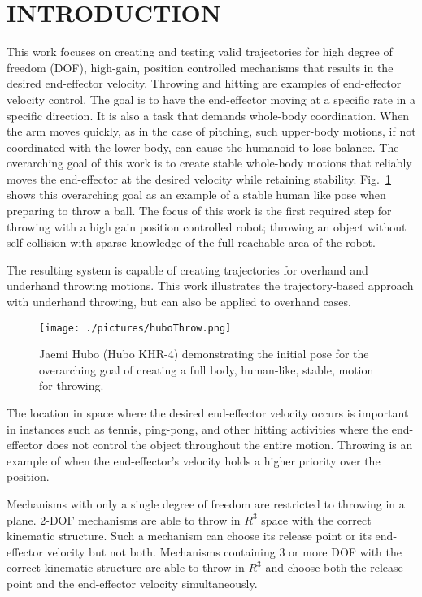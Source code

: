 \section{INTRODUCTION}\label{sec:intro}

This work focuses on creating and testing valid trajectories for high degree of freedom (DOF), high-gain, position controlled mechanisms that results in the desired end-effector velocity.  Throwing and hitting are examples of end-effector velocity control.  The goal is to have the end-effector moving at a specific rate in a specific direction.  It is also a task that demands whole-body coordination.  When the arm moves quickly, as in the case of pitching, such upper-body motions, if not coordinated with the lower-body, can cause the humanoid to lose balance.  The overarching goal of this work is to create stable whole-body motions that reliably moves the end-effector at the desired velocity while retaining stability.  Fig.~\ref{fig:huboOneFoot} shows this overarching goal as an example of a stable human like pose when preparing to throw a ball.  The focus of this work is the first required step for throwing with a high gain position controlled robot; throwing an object without self-collision with sparse knowledge of the full reachable area of the robot.  

The resulting system is capable of creating trajectories for overhand and underhand throwing motions.  This work illustrates the trajectory-based approach with underhand throwing, but can also be applied to overhand cases.

\begin{figure}[t!]%
  \centering
\texttt{[image: ./pictures/huboThrow.png]}
  \caption{Jaemi Hubo (Hubo KHR-4) demonstrating the initial pose for the overarching goal of creating a full body, human-like, stable, motion for throwing.}
  \label{fig:huboOneFoot}
\end{figure}

The location in space where the desired end-effector velocity occurs is important in instances such as tennis, ping-pong, and other hitting activities where the end-effector does not control the object throughout the entire motion.  Throwing is an example of when the end-effector's velocity holds a higher priority over the position.  


Mechanisms with only a single degree of freedom are restricted to throwing in a plane.   2-DOF mechanisms are able to throw in $R^3$ space with the correct kinematic structure.  Such a mechanism can choose its release point or its end-effector velocity but not both.  Mechanisms containing 3 or more DOF with the correct kinematic structure are able to throw in $R^3$ and choose both the release point and the end-effector velocity simultaneously.  

